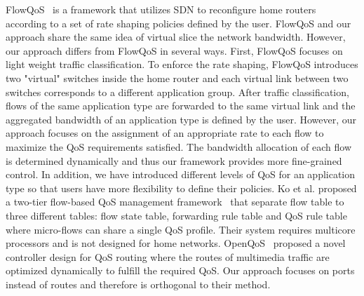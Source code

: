 FlowQoS~\cite{Seddiki_HotSDN14} is a framework that utilizes SDN to reconfigure home routers according to a set of rate shaping
policies defined by the user. FlowQoS and our approach share the same idea of virtual slice the network bandwidth. However,
our approach differs from FlowQoS in several ways. First, FlowQoS focuses on light weight traffic classification. To enforce
the rate shaping, FlowQoS introduces two "virtual" switches inside the home router and each virtual link between two switches 
corresponds to a different application group. After traffic classification, flows of the same application type are forwarded to
the same virtual link and the aggregated bandwidth of an application type is defined by the user. However, our approach focuses
on the assignment of an appropriate rate to each flow to maximize the QoS requirements satisfied. The bandwidth allocation of each
flow is determined dynamically and thus our framework provides more fine-grained control. In addition, we have introduced different
levels of QoS for an application type so that users have more flexibility to define their policies. Ko et al. proposed a two-tier
flow-based QoS management framework~\cite{Ko_IEICE13} that separate flow table to three different tables: flow state table, forwarding
rule table and QoS rule table where micro-flows can share a single QoS profile. Their system requires multicore processors and is
not designed for home networks. OpenQoS~\cite{Egilmez_ASPIPA12} proposed a novel controller design for QoS routing where the routes of
multimedia traffic are optimized dynamically to fulfill the required QoS. Our approach focuses on ports instead of routes and therefore
is orthogonal to their method.

